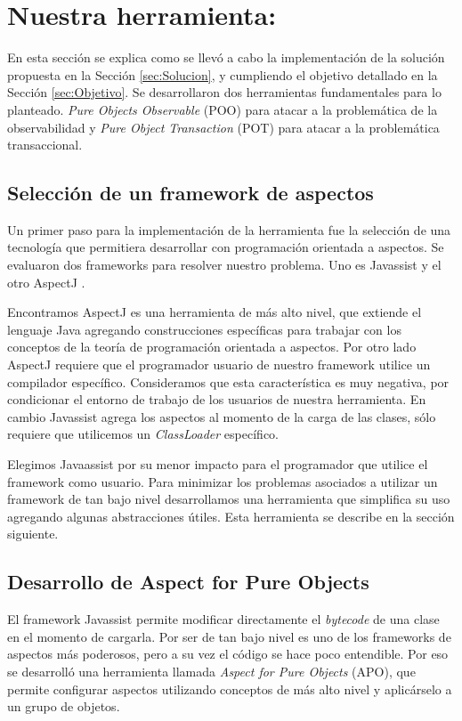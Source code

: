 \section{Nuestra herramienta: }

En esta sección se explica como se llevó a cabo la implementación de la solución
propuesta en la Sección \ref{sec:Solucion}, y cumpliendo el objetivo detallado
en la Sección \ref{sec:Objetivo}. Se desarrollaron dos herramientas
fundamentales para lo planteado. \emph{Pure Objects Observable} (POO) para atacar a la
problemática de la observabilidad y \emph{Pure Object Transaction} (POT) para
atacar a la problemática transaccional.
	
	\subsection{Selección de un framework de aspectos}  
	Un primer paso para la implementación de la herramienta fue la selección de una
	tecnología que permitiera desarrollar con programación orientada a aspectos.
	Se evaluaron dos frameworks para resolver nuestro problema.
	Uno es Javassist \cite{??} y el otro AspectJ \cite{KiczalesHHKPG01}.
	
	\medskip 
	Encontramos AspectJ es una herramienta de más alto nivel, que extiende
	el lenguaje Java agregando construcciones específicas para trabajar con
	los conceptos de la teoría de programación orientada a aspectos.
	Por otro lado AspectJ requiere que el programador usuario de nuestro framework
	utilice un compilador específico. Consideramos que esta característica es muy
	negativa, por condicionar el entorno de trabajo de los usuarios de nuestra
	herramienta.
	En cambio Javassist agrega los aspectos al momento de la carga de las clases,
	sólo requiere que utilicemos un \emph{ClassLoader} específico.

	Elegimos Javaassist por su menor impacto para el programador que utilice el
	framework como usuario.
	Para minimizar los problemas asociados a utilizar un framework de tan bajo
	nivel desarrollamos una herramienta que simplifica su uso agregando algunas
	abstracciones útiles. Esta herramienta se describe en la sección siguiente.

	\subsection{Desarrollo de Aspect for Pure Objects}

	El framework Javassist permite modificar directamente el \emph{bytecode} de
	una clase en el momento de cargarla.
	Por ser de tan bajo nivel es uno de los frameworks de aspectos más poderosos,
	pero a su vez el código se hace poco entendible.
	Por eso se desarrolló una herramienta llamada \emph{Aspect for Pure Objects} (APO), 
	que permite configurar aspectos utilizando conceptos de más alto nivel y
	aplicárselo a un grupo de objetos.
	

